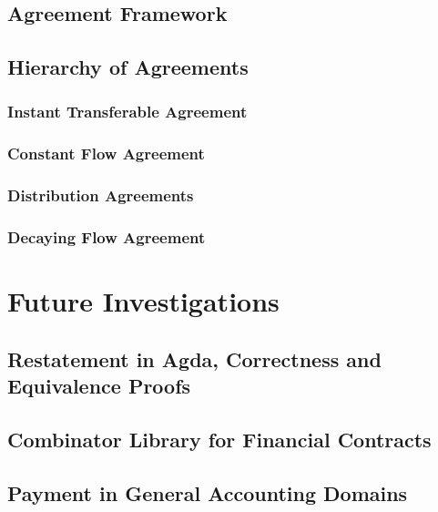 \section{Agreement Framework}

\section{Hierarchy of Agreements}

\subsection{Instant Transferable Agreement}

\subsection{Constant Flow Agreement}

\subsection{Distribution Agreements}

\subsection{Decaying Flow Agreement}

\chapter{Future Investigations}

\section{Restatement in Agda, Correctness and Equivalence Proofs}

\section{Combinator Library for Financial Contracts}

\section{Payment in General Accounting Domains}

\newpage
\printbibliography{}



